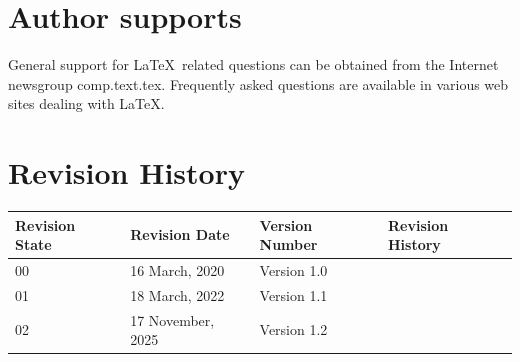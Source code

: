 \documentclass{article}
\begin{document}
\section{Author supports}
General support for \LaTeX\ related questions can be obtained from the Internet newsgroup comp.text.tex. Frequently asked questions are available in various web sites dealing with \LaTeX.


\section{Revision History}

\begin{tabular}{|l|l|l|l|}
\hline
Revision State & Revision Date &  Version Number & Revision History\\
\hline
 00 &    16 March, 2020 & Version 1.0   &   \\
 \hline
 01 &    18 March, 2022 & Version 1.1   &   \\
 \hline
 02 &    17 November, 2025 & Version 1.2   &   \\
 \hline
\end{tabular}
\end{document}
